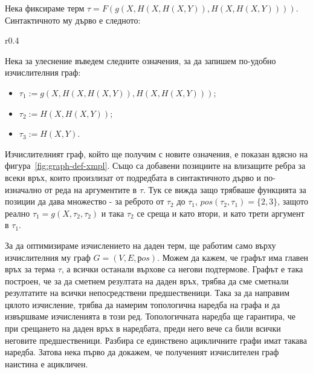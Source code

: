 \documentclass[12pt,twoside,a4paper]{article}
\begin{document}
	\label{xmpl:tree-graph}
	\indent Нека фиксираме терм $\tau=F(g(X,H(X,H(X,Y)),H(X,H(X,Y))))$. Синтактичното му дърво е следното:
	\begin{center}
		\vspace{-0.5cm}
		
		\label{fig:tree-xmpl}
	\end{center}
	
	\begin{wrapfigure}[10]{r}{0.4\textwidth}
		\vspace{-0.5cm}
		\begin{center}
			
		\end{center}
		\vspace{-0.5cm}
		\label{fig:graph-def-xmpl}
	\end{wrapfigure}
	Нека за улеснение въведем следните означения, за да запишем по-удобно изчислителния граф:
	\begin{itemize}
		\item $\tau_1:=g(X,H(X,H(X,Y)),H(X,H(X,Y)))$;
		\item $\tau_2:=H(X,H(X,Y))$;
		\item $\tau_3:=H(X,Y)$.
	\end{itemize}
	Изчислителният граф, който ще получим с новите означения, е показан вдясно на фигура~\ref{fig:graph-def-xmpl}. Също са добавени позициите на влизащите ребра за всеки връх, които произлизат от подредбата в синтактичното дърво и по-изначално от реда на аргументите в $\tau$. Тук се вижда защо трябваше функцията за позиции да дава множество - за реброто от $\tau_2$ до $\tau_1$, $pos(\tau_2, \tau_1)=\{2,3\}$, защото реално $\tau_1=g(X,\tau_2,\tau_2)$ и така $\tau_2$ се среща и като втори, и като трети аргумент в $\tau_1$.
	\finexample
	
	За да оптимизираме изчислението на даден терм, ще работим само върху изчислителния му граф $G=(V,E,рos)$. Можем да кажем, че графът има главен връх за терма $\tau$, а всички останали върхове са негови подтермове. Графът е така построен, че за да сметнем резултата на даден връх, трябва да сме сметнали резултатите на всички непосредствени предшественици. Така за да направим цялото изчисление, трябва да намерим топологична наредба на графа и да извършваме изчисленията в този ред. Топологичната наредба ще гарантира, че при срещането на даден връх в наредбата, преди него вече са били всички неговите предшественици. Разбира се единствено ацикличните графи имат такава наредба. Затова нека първо да докажем, че полученият изчислителен граф наистина е ацикличен.
	
\end{document}
